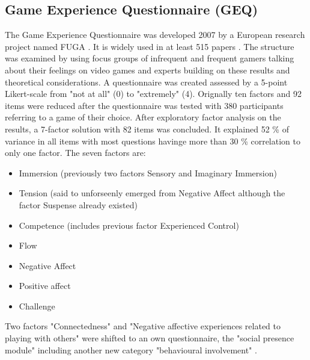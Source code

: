 \subsection{Game Experience Questionnaire (GEQ)}
The Game Experience Questionnaire was developed 2007 by a European research project named FUGA \cite{poels2007game}. It is widely used in at least 515 papers \cite{law2018systematic}. The structure was examined by using focus groups of infrequent and frequent gamers talking about their feelings on video games and experts building on these results and theoretical considerations. A questionnaire was created assessed by a 5-point Likert-scale from "not at all" (0) to "extremely" (4). Orignally ten factors and 92 items were reduced after the questionnaire was tested with 380 participants referring to a game of their choice. After exploratory factor analysis on the results, a 7-factor solution with 82 items was concluded. It explained 52 \% of variance in all items with most questions havinge more than 30 \% correlation to only one factor. The seven factors are:
\begin{itemize}[noitemsep]
	\item Immersion (previously two factors Sensory and Imaginary Immersion)
	\item Tension (said to unforseenly emerged from Negative Affect although the factor Suspense already existed)
	\item Competence (includes previous factor Experienced Control)
	\item Flow
	\item Negative Affect
	\item Positive affect
	\item Challenge
\end{itemize}
Two factors "Connectedness" and "Negative affective experiences related to playing with others" were shifted to an own questionnaire, the "social presence module" including another new category "behavioural involvement" .

